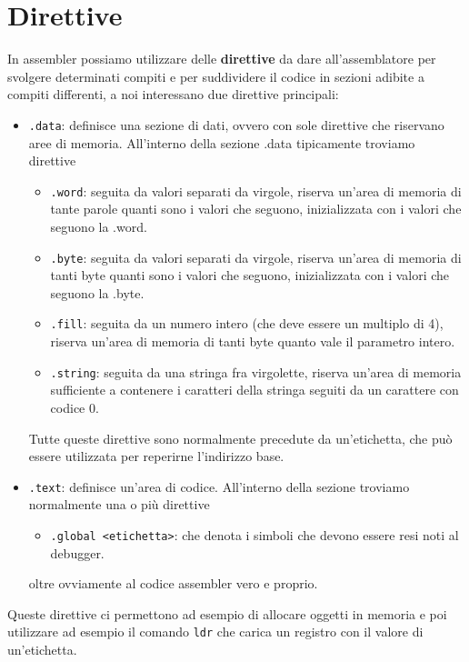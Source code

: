 \section{Direttive}
In assembler possiamo utilizzare delle \textbf{direttive} da dare all'assemblatore per svolgere
determinati compiti e per suddividere il codice in sezioni adibite a compiti differenti, a noi
interessano due direttive principali:
\begin{itemize}
	\item \verb|.data|: definisce una sezione di dati, ovvero con sole direttive che riservano aree
	      di memoria. All'interno della sezione .data tipicamente troviamo direttive
	      \begin{itemize}
		      \item \verb|.word|: seguita da valori separati da virgole, riserva un'area di
		            memoria di tante parole quanti sono i valori che seguono, inizializzata con i
		            valori che seguono la .word.
		      \item \verb|.byte|: seguita da valori separati da virgole, riserva un'area di
		            memoria di tanti byte quanti sono i valori che seguono, inizializzata con i
		            valori che seguono la .byte.
		      \item \verb|.fill|: seguita da un numero intero (che deve essere un multiplo di 4),
		            riserva un'area di memoria di tanti byte quanto vale il parametro intero.
		      \item \verb|.string|: seguita da una stringa fra virgolette, riserva un'area di
		            memoria sufficiente a contenere i caratteri della stringa seguiti da un
		            carattere con codice 0.
	      \end{itemize}
	      Tutte queste direttive sono normalmente precedute da un'etichetta, che può essere
	      utilizzata per reperirne l'indirizzo base.
	\item \verb|.text|: definisce un'area di codice. All'interno della sezione troviamo normalmente
	      una o più direttive
	      \begin{itemize}
		      \item \verb|.global <etichetta>|: che denota i simboli che devono essere resi noti al
		            debugger.
	      \end{itemize}
	      oltre ovviamente al codice assembler vero e proprio.
\end{itemize}
Queste direttive ci permettono ad esempio di allocare oggetti in memoria e poi utilizzare ad
esempio il comando \verb|ldr| che carica un registro con il valore di un'etichetta.